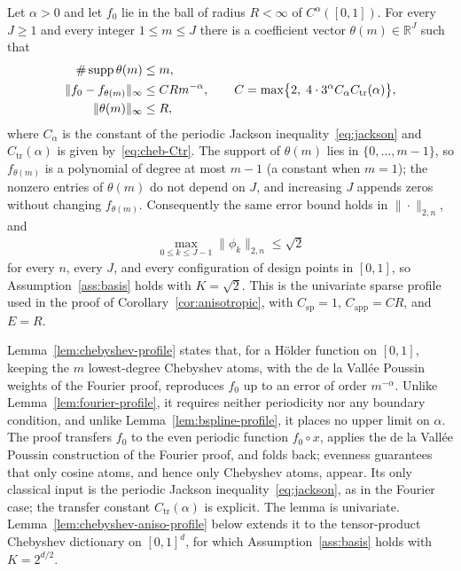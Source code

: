 \begin{auxlemma}
\label{lem:chebyshev-profile}
Let $\alpha>0$ and let $f_0$ lie in the ball of radius $R<\infty$ of $C^\alpha([0,1])$. For every $J\geq1$ and every integer $1\leq m\leq J$ there is a coefficient vector $\theta(m)\in\mathbb R^J$ such that
\begin{align}
\#\operatorname{supp}\theta(m)
&\leq m,\notag\\
\|f_0-f_{\theta(m)}\|_\infty
&\leq CRm^{-\alpha},
\qquad C=\max\bigl\{2,\;4\cdot3^\alpha C_\alpha C_{\mathrm{tr}}(\alpha)\bigr\},
\label{eq:chebyshev-profile}\\
\|\theta(m)\|_\infty&\leq R,\notag
\end{align}
where $C_\alpha$ is the constant of the periodic Jackson inequality~\eqref{eq:jackson} and $C_{\mathrm{tr}}(\alpha)$ is given by~\eqref{eq:cheb-Ctr}. The support of $\theta(m)$ lies in $\{0,\ldots,m-1\}$, so $f_{\theta(m)}$ is a polynomial of degree at most $m-1$ (a constant when $m=1$); the nonzero entries of $\theta(m)$ do not depend on $J$, and increasing $J$ appends zeros without changing $f_{\theta(m)}$. Consequently the same error bound holds in $\|\cdot\|_{2,n}$, and
\begin{align*}
\max_{0\leq k\leq J-1}\|\phi_k\|_{2,n}\leq\sqrt2
\end{align*}
for every $n$, every $J$, and every configuration of design points in $[0,1]$, so Assumption~\ref{ass:basis} holds with $K=\sqrt2$. This is the univariate sparse profile used in the proof of Corollary~\ref{cor:anisotropic}, with $C_{\mathrm{sp}}=1$, $C_{\mathrm{app}}=CR$, and $E=R$.
\end{auxlemma}

Lemma~\ref{lem:chebyshev-profile} states that, for a H\"older function on $[0,1]$, keeping the $m$ lowest-degree Chebyshev atoms, with the de la Vall\'ee Poussin weights of the Fourier proof, reproduces $f_0$ up to an error of order $m^{-\alpha}$. Unlike Lemma~\ref{lem:fourier-profile}, it requires neither periodicity nor any boundary condition, and unlike Lemma~\ref{lem:bspline-profile}, it places no upper limit on $\alpha$. The proof transfers $f_0$ to the even periodic function $f_0\circ x$, applies the de la Vall\'ee Poussin construction of the Fourier proof, and folds back; evenness guarantees that only cosine atoms, and hence only Chebyshev atoms, appear. Its only classical input is the periodic Jackson inequality~\eqref{eq:jackson}, as in the Fourier case; the transfer constant $C_{\mathrm{tr}}(\alpha)$ is explicit. The lemma is univariate. Lemma~\ref{lem:chebyshev-aniso-profile} below extends it to the tensor-product Chebyshev dictionary on $[0,1]^d$, for which Assumption~\ref{ass:basis} holds with $K=2^{d/2}$.

